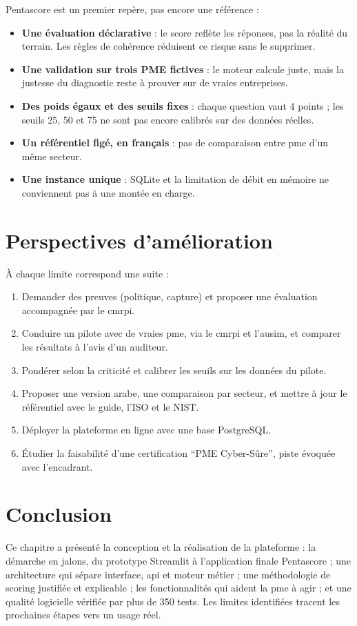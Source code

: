 Pentascore est un premier repère, pas encore une référence :

\begin{itemize}
  \item \textbf{Une évaluation déclarative} : le score reflète les réponses, pas la réalité du terrain. Les règles de cohérence réduisent ce risque sans le supprimer.
  \item \textbf{Une validation sur trois PME fictives} : le moteur calcule juste, mais la justesse du diagnostic reste à prouver sur de vraies entreprises.
  \item \textbf{Des poids égaux et des seuils fixes} : chaque question vaut 4 points ; les seuils 25, 50 et 75 ne sont pas encore calibrés sur des données réelles.
  \item \textbf{Un référentiel figé, en français} : pas de comparaison entre \gls{pme} d'un même secteur.
  \item \textbf{Une instance unique} : SQLite et la limitation de débit en mémoire ne conviennent pas à une montée en charge.
\end{itemize}

\clearpage
\section{Perspectives d'amélioration}
\label{sec:perspectives}

À chaque limite correspond une suite :

\begin{enumerate}
  \item Demander des preuves (politique, capture) et proposer une évaluation accompagnée par le \gls{cmrpi}.
  \item Conduire un pilote avec de vraies \gls{pme}, via le \gls{cmrpi} et l'\gls{ausim}, et comparer les résultats à l'avis d'un auditeur.
  \item Pondérer selon la criticité et calibrer les seuils sur les données du pilote.
  \item Proposer une version arabe, une comparaison par secteur, et mettre à jour le référentiel avec le guide, l'ISO et le NIST.
  \item Déployer la plateforme en ligne avec une base PostgreSQL.
  \item Étudier la faisabilité d'une certification \enquote{PME Cyber-Sûre}, piste évoquée avec l'encadrant.
\end{enumerate}

\section*{Conclusion}

Ce chapitre a présenté la conception et la réalisation de la plateforme : la démarche en jalons, du prototype Streamlit à l'application finale Pentascore ; une architecture qui sépare interface, \gls{api} et moteur métier ; une méthodologie de scoring justifiée et explicable ; les fonctionnalités qui aident la \gls{pme} à agir ; et une qualité logicielle vérifiée par plus de 350 tests. Les limites identifiées tracent les prochaines étapes vers un usage réel.
